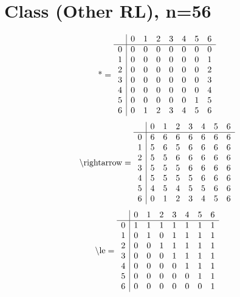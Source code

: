 \documentclass[11pt]{article}
\begin{document}
\section{Class (Other RL), n=56}
\[\text{*} = 
\begin{array}{r | r r r r r r r}
 & 0 & 1 & 2 & 3 & 4 & 5 & 6 \\ \hline
0 & 0 & 0 & 0 & 0 & 0 & 0 & 0 \\
1 & 0 & 0 & 0 & 0 & 0 & 0 & 1 \\
2 & 0 & 0 & 0 & 0 & 0 & 0 & 2 \\
3 & 0 & 0 & 0 & 0 & 0 & 0 & 3 \\
4 & 0 & 0 & 0 & 0 & 0 & 0 & 4 \\
5 & 0 & 0 & 0 & 0 & 0 & 1 & 5 \\
6 & 0 & 1 & 2 & 3 & 4 & 5 & 6 \\
\end{array}
\]
\[\text{\textbackslash rightarrow} = 
\begin{array}{r | r r r r r r r}
 & 0 & 1 & 2 & 3 & 4 & 5 & 6 \\ \hline
0 & 6 & 6 & 6 & 6 & 6 & 6 & 6 \\
1 & 5 & 6 & 5 & 6 & 6 & 6 & 6 \\
2 & 5 & 5 & 6 & 6 & 6 & 6 & 6 \\
3 & 5 & 5 & 5 & 6 & 6 & 6 & 6 \\
4 & 5 & 5 & 5 & 5 & 6 & 6 & 6 \\
5 & 4 & 5 & 4 & 5 & 5 & 6 & 6 \\
6 & 0 & 1 & 2 & 3 & 4 & 5 & 6 \\
\end{array}
\]
\[\text{\textbackslash le} = 
\begin{array}{r | r r r r r r r}
 & 0 & 1 & 2 & 3 & 4 & 5 & 6 \\ \hline
0 & 1 & 1 & 1 & 1 & 1 & 1 & 1 \\
1 & 0 & 1 & 0 & 1 & 1 & 1 & 1 \\
2 & 0 & 0 & 1 & 1 & 1 & 1 & 1 \\
3 & 0 & 0 & 0 & 1 & 1 & 1 & 1 \\
4 & 0 & 0 & 0 & 0 & 1 & 1 & 1 \\
5 & 0 & 0 & 0 & 0 & 0 & 1 & 1 \\
6 & 0 & 0 & 0 & 0 & 0 & 0 & 1 \\
\end{array}
\]
\end{document}
